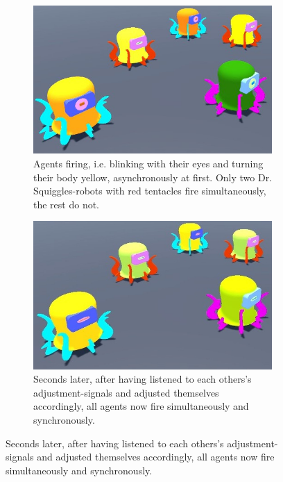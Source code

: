 	\begin{figure}[ht!]
		\centering
			\begin{subfigure}[t]{.5\textwidth}
				\centering\captionsetup{width=.9\linewidth}%
				\includegraphics[width=0.9\linewidth]{Assets/Figures/IntroUnsynch.jpg}
				\caption{Agents firing, i.e. blinking with their eyes and turning their body yellow, asynchronously at first. Only two Dr. Squiggles-robots with red tentacles fire simultaneously, the rest do not.}
				\label{fig:first_idea:second_fig:unsynched}
			\end{subfigure}%
			\begin{subfigure}[t]{.5\textwidth}
				\centering\captionsetup{width=.9\linewidth}%
				\includegraphics[width=0.9\linewidth]{Assets/Figures/IntroSynch.jpg}
				\caption{Seconds later, after having listened to each others's adjustment-signals and adjusted themselves accordingly, all agents now fire simultaneously and synchronously.}
				\label{fig:first_idea:second_fig:synched}

\end{subfigure}
\end{figure}

